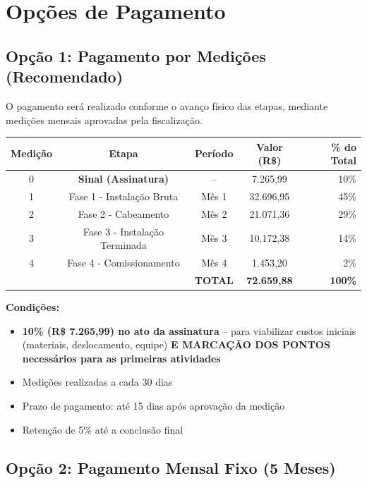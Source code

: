 \documentclass[12pt,a4paper]{article}
\renewenvironment{table}%
{\begin{center}%
\scriptsize%
\addtolength{\tabcolsep}{-2pt}%
}%
{\end{center}}
\begin{document}
\section{Opções de Pagamento}

\subsection{Opção 1: Pagamento por Medições (Recomendado)}

O pagamento será realizado conforme o avanço físico das etapas, mediante medições mensais aprovadas pela fiscalização.

\begin{table}
\centering
\begin{tabular}{ccccr}
\toprule
\textbf{Medição} & \textbf{Etapa} & \textbf{Período} & \textbf{Valor (R\$)} & \textbf{\% do Total} \\
\midrule
0 & \textbf{Sinal (Assinatura)} & -- & 7.265,99 & 10\% \\
1 & Fase 1 - Instalação Bruta & Mês 1 & 32.696,95 & 45\% \\
2 & Fase 2 - Cabeamento & Mês 2 & 21.071,36 & 29\% \\
3 & Fase 3 - Instalação Terminada & Mês 3 & 10.172,38 & 14\% \\
4 & Fase 4 - Comissionamento & Mês 4 & 1.453,20 & 2\% \\
\midrule
 & & \textbf{TOTAL} & \textbf{72.659,88} & \textbf{100\%} \\
\bottomrule
\end{tabular}
\end{table}

\noindent\textbf{Condições:}
\begin{itemize}
\item \textbf{10\% (R\$ 7.265,99) no ato da assinatura} -- para viabilizar custos iniciais (materiais, deslocamento, equipe) \textbf{E MARCAÇÃO DOS PONTOS necessários para as primeiras atividades}
\item Medições realizadas a cada 30 dias
\item Prazo de pagamento: até 15 dias após aprovação da medição
\item Retenção de 5\% até a conclusão final
\end{itemize}

\pagebreak

\subsection{Opção 2: Pagamento Mensal Fixo (5 Meses)}
\end{document}

